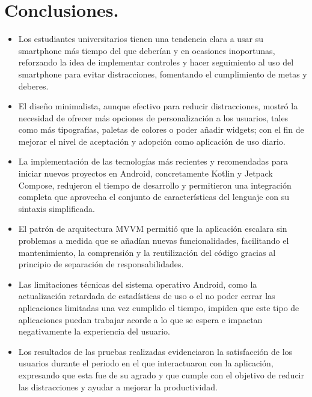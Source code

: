 \section{Conclusiones.}
\label{sec:conclusiones}

\begin{itemize}
  \item Los estudiantes universitarios tienen una tendencia clara a usar su smartphone más tiempo del que deberían y en ocasiones inoportunas, reforzando la idea de implementar controles y hacer seguimiento al uso del smartphone para evitar distracciones, fomentando el cumplimiento de metas y deberes.
  \item El diseño minimalista, aunque efectivo para reducir distracciones, mostró la necesidad de ofrecer más opciones de personalización a los usuarios, tales como más tipografías, paletas de colores o poder añadir widgets; con el fin de mejorar el nivel de aceptación y adopción como aplicación de uso diario.
  \item La implementación de las tecnologías más recientes y recomendadas para iniciar nuevos proyectos en Android, concretamente Kotlin y Jetpack Compose, redujeron el tiempo de desarrollo y permitieron una integración completa que aprovecha el conjunto de características del lenguaje con su sintaxis simplificada.
  \item El patrón de arquitectura MVVM permitió que la aplicación escalara sin problemas a medida que se añadían nuevas funcionalidades, facilitando el mantenimiento, la comprensión y la reutilización del código gracias al principio de separación de responsabilidades.
  \item Las limitaciones técnicas del sistema operativo Android, como la actualización retardada de estadísticas de uso o el no poder cerrar las aplicaciones limitadas una vez cumplido el tiempo, impiden que este tipo de aplicaciones puedan trabajar acorde a lo que se espera e impactan negativamente la experiencia del usuario.
  \item Los resultados de las pruebas realizadas evidenciaron la satisfacción de los usuarios durante el periodo en el que interactuaron con la aplicación, expresando que esta fue de su agrado y que cumple con el objetivo de reducir las distracciones y ayudar a mejorar la productividad.
\end{itemize}